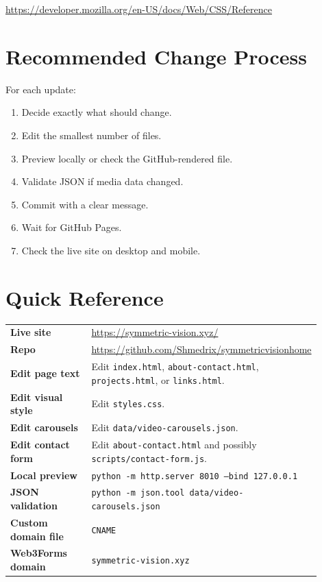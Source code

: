 \documentclass[11pt]{article}
\begin{document}
\url{https://developer.mozilla.org/en-US/docs/Web/CSS/Reference}

\section{Recommended Change Process}

For each update:

\begin{enumerate}
  \item Decide exactly what should change.
  \item Edit the smallest number of files.
  \item Preview locally or check the GitHub-rendered file.
  \item Validate JSON if media data changed.
  \item Commit with a clear message.
  \item Wait for GitHub Pages.
  \item Check the live site on desktop and mobile.
\end{enumerate}

\section{Quick Reference}

\begin{longtable}{>{\bfseries}p{0.28\linewidth}p{0.62\linewidth}}
Live site & \url{https://symmetric-vision.xyz/}\\
Repo & \url{https://github.com/Shmedrix/symmetricvisionhome}\\
Edit page text & Edit \texttt{index.html}, \texttt{about-contact.html}, \texttt{projects.html}, or \texttt{links.html}.\\
Edit visual style & Edit \texttt{styles.css}.\\
Edit carousels & Edit \texttt{data/video-carousels.json}.\\
Edit contact form & Edit \texttt{about-contact.html} and possibly \texttt{scripts/contact-form.js}.\\
Local preview & \texttt{python -m http.server 8010 --bind 127.0.0.1}\\
JSON validation & \texttt{python -m json.tool data/video-carousels.json}\\
Custom domain file & \texttt{CNAME}\\
Web3Forms domain & \texttt{symmetric-vision.xyz}\\
\end{longtable}
\end{document}
